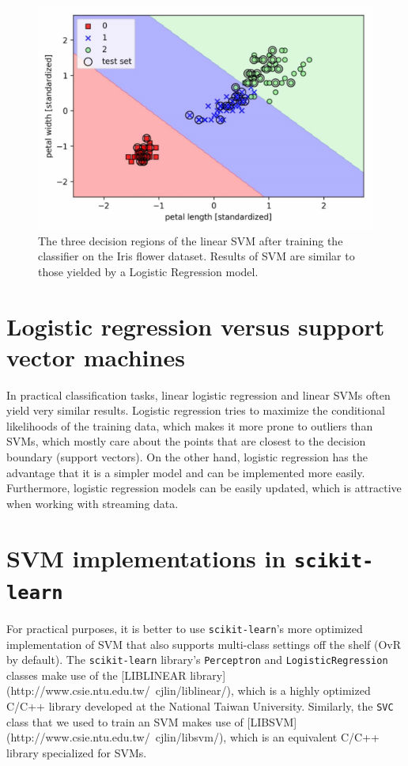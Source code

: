 \documentclass[11pt]{article}
\begin{document}
    \begin{figure}[hbt!]
        \centering
        \includegraphics[width=1\linewidth,trim=4 4 4 4,clip]{svm/img/iris_svm_linear.png}
        \caption{The three decision regions of the linear SVM after training the classifier on the Iris flower dataset. Results of SVM are similar to those yielded by a Logistic Regression model.}
        \label{fig:iris_svm_linear}
    \end{figure}

    \section{Logistic regression versus support vector machines} \label{sec:log_reg_vs_svm}

    In practical classification tasks, linear logistic regression and linear SVMs often yield very similar results. Logistic regression tries to maximize the conditional likelihoods of the training data, which makes it more prone to outliers than SVMs, which mostly care about the points that are closest to the decision boundary (support vectors). On the other hand, logistic regression has the advantage that it is a simpler model and can be implemented more easily. Furthermore, logistic regression models can be easily updated, which is attractive when working with streaming data.

    \section{SVM implementations in \texttt{scikit-learn}}

    For practical purposes, it is better to use \texttt{scikit-learn}'s more optimized implementation of SVM that also supports multi-class settings off the shelf (OvR by default). The \texttt{scikit-learn} library's \texttt{Perceptron} and \texttt{LogisticRegression} classes make use of the [LIBLINEAR library](http://www.csie.ntu.edu.tw/~cjlin/liblinear/), which is a highly optimized C/C++ library developed at the National Taiwan University. Similarly, the \texttt{SVC} class that we used to train an SVM makes use of [LIBSVM](http://www.csie.ntu.edu.tw/~cjlin/libsvm/), which is an equivalent C/C++ library specialized for SVMs.
\end{document}
